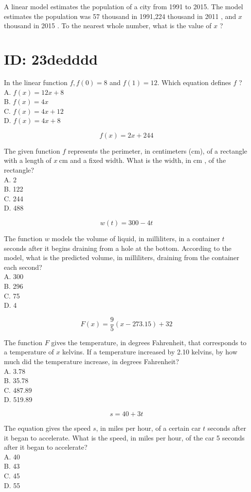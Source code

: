 A linear model estimates the population of a city from 1991 to 2015. The model estimates the population was 57 thousand in 1991,224 thousand in 2011 , and $x$ thousand in 2015 . To the nearest whole number, what is the value of $x$ ?

\section*{ID: 23dedddd}
In the linear function $f, f(0)=8$ and $f(1)=12$. Which equation defines $f$ ?\\
A. $f(x)=12 x+8$\\
B. $f(x)=4 x$\\
C. $f(x)=4 x+12$\\
D. $f(x)=4 x+8$

$$
f(x)=2 x+244
$$

The given function $f$ represents the perimeter, in centimeters (cm), of a rectangle with a length of $x \mathrm{~cm}$ and a fixed width. What is the width, in cm , of the rectangle?\\
A. 2\\
B. 122\\
C. 244\\
D. 488

$$
w(t)=300-4 t
$$

The function $w$ models the volume of liquid, in milliliters, in a container $t$ seconds after it begins draining from a hole at the bottom. According to the model, what is the predicted volume, in milliliters, draining from the container each second?\\
A. 300\\
B. 296\\
C. 75\\
D. 4

$$
F(x)=\frac{9}{5}(x-273.15)+32
$$

The function $F$ gives the temperature, in degrees Fahrenheit, that corresponds to a temperature of $x$ kelvins. If a temperature increased by 2.10 kelvins, by how much did the temperature increase, in degrees Fahrenheit?\\
A. 3.78\\
B. 35.78\\
C. 487.89\\
D. 519.89

$$
s=40+3 t
$$

The equation gives the speed $s$, in miles per hour, of a certain car $t$ seconds after it began to accelerate. What is the speed, in miles per hour, of the car 5 seconds after it began to accelerate?\\
A. 40\\
B. 43\\
C. 45\\
D. 55

